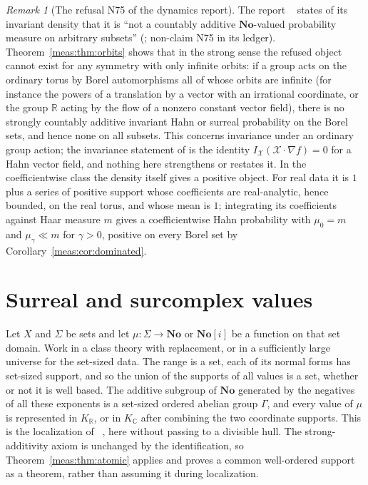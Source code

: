 \documentclass[11pt]{article}
\numberwithin{equation}{section}
\theoremstyle{definition}
\theoremstyle{remark}
\newtheorem{remark}[theorem]{Remark}
\newcommand{\R}{\mathbb R}
\newcommand{\C}{\mathbb C}
\newcommand{\No}{\mathbf{No}}
\newcommand{\KR}{K_{\R}}
\newcommand{\KC}{K_{\C}}
\begin{document}
\begin{remark}[The refusal N75 of the dynamics report]\label{meas:rem:dynamics}
The report ~\cite{repodyn} states
of its invariant density  that it is ``not a
countably additive $\No$-valued probability measure on arbitrary subsets''
(; non-claim N75 in its ledger).
Theorem~\ref{meas:thm:orbits} shows that in the strong sense the refused object
cannot exist for any symmetry with only infinite orbits: if a group acts on the
ordinary torus by Borel automorphisms all of whose orbits are infinite (for
instance the powers of a translation by a vector with an irrational
coordinate, or the group $\R$ acting by the flow of a nonzero constant vector
field), there is no strongly countably additive invariant Hahn or surreal
probability on the Borel sets, and hence none on all subsets. This concerns
invariance under an ordinary group action; the invariance statement of
 is the identity
$I_{\mathcal X}(\mathcal X\cdot\nabla f)=0$ for a Hahn vector field, and nothing
here strengthens or restates it. In the coefficientwise class the density
itself gives a positive object. For real data it is $1$ plus a series of
positive support whose coefficients are real-analytic, hence bounded, on the
real torus, and whose mean is $1$; integrating its coefficients against Haar
measure $m$ gives a coefficientwise Hahn probability with $\mu_0=m$ and
$\mu_\gamma\ll m$ for $\gamma>0$, positive on every Borel set by
Corollary~\ref{meas:cor:dominated}.
\end{remark}

\section{Surreal and surcomplex values}\label{meas:sec:surreal}

Let $X$ and $\Sigma$ be sets and let $\mu:\Sigma\to\No$ or $\No[i]$ be a
function on that set domain. Work in a class theory with replacement, or in a
sufficiently large universe for the set-sized data. The range is a set, each
of its normal forms has set-sized support, and so the union of the supports of
all values is a set, whether or not it is well based. The additive subgroup of
$\No$ generated by the negatives of all these exponents is a set-sized ordered
abelian group $\Gamma$, and every value of $\mu$ is represented in $\KR$, or in
$\KC$ after combining the two coordinate supports. This is the localization of
~\cite{repofound}, here without passing to a
divisible hull. The strong-additivity axiom is unchanged by the
identification, so Theorem~\ref{meas:thm:atomic} applies and proves a common
well-ordered support as a theorem, rather than assuming it during
localization.
\end{document}
